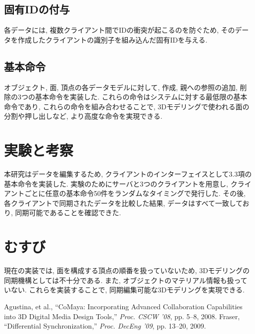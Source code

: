 \documentclass{AIabst}
\begin{document}
	\subsection{固有IDの付与}
	各データには, 複数クライアント間でIDの衝突が起こるのを防ぐため, そのデータを作成したクライアントの識別子を組み込んだ固有IDを与える.
	\subsection{基本命令}
	オブジェクト, 面, 頂点の各データモデルに対して, 作成, 親への参照の追加, 削除の3つの基本命令を実装した.
	これらの命令はシステムに対する最低限の基本命令であり, これらの命令を組み合わせることで, 3Dモデリングで使われる面の分割や押し出しなど, より高度な命令を実現できる.
\section{実験と考察}
本研究はデータを編集するため, クライアントのインターフェイスとして3.3項の基本命令を実装した.
実験のためにサーバと3つのクライアントを用意し, クライアントごとに任意の基本命令50件をランダムなタイミングで発行した.
 その後, 各クライアントで同期されたデータを比較した結果, データはすべて一致しており, 同期可能であることを確認できた.
\section{むすび}
 現在の実装では, 面を構成する頂点の順番を扱っていないため, 3Dモデリングの同期機構としては不十分である. また, オブジェクトのマテリアル情報も扱っていない.
これらを実装することで, 同期編集可能な3Dモデリングを実現できる.

\begin{thebibliography}{9}
	Agustina, et al., ``CoMaya: Incorporating Advanced Collaboration Capabilities into 3D Digital Media Design Tools,'' {\it Proc. CSCW '08}, pp. 5--8, 2008.
  Fraser,	``Differential Synchronization,''  {\it Proc. DecEng '09}, pp. 13--20, 2009.
\end{thebibliography}
\end{document}
